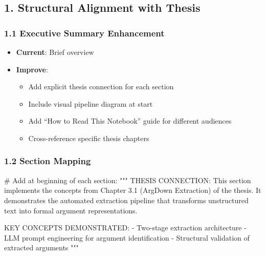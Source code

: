 \documentclass[
  11pt,
  letterpaper,
]{book}
\newenvironment{Shaded}{\begin{snugshade}}{\end{snugshade}}
\newcommand{\CommentTok}[1]{\textcolor[rgb]{0.37,0.37,0.37}{#1}}
\providecommand{\tightlist}{%
  \setlength{\itemsep}{0pt}\setlength{\parskip}{0pt}}
\begin{document}
\subsection{1. Structural Alignment with
Thesis}\label{structural-alignment-with-thesis}

\subsubsection{1.1 Executive Summary
Enhancement}\label{executive-summary-enhancement}

\begin{itemize}
\tightlist
\item
  \textbf{Current}: Brief overview
\item
  \textbf{Improve}:

  \begin{itemize}
  \tightlist
  \item
    Add explicit thesis connection for each section
  \item
    Include visual pipeline diagram at start
  \item
    Add ``How to Read This Notebook'' guide for different audiences
  \item
    Cross-reference specific thesis chapters
  \end{itemize}
\end{itemize}

\subsubsection{1.2 Section Mapping}\label{section-mapping}

\begin{Shaded}
\begin{Highlighting}[]
\CommentTok{\# Add at beginning of each section:}
\CommentTok{"""}
\CommentTok{THESIS CONNECTION: This section implements the concepts from Chapter 3.1 }
\CommentTok{(ArgDown Extraction) of the thesis. It demonstrates the automated extraction }
\CommentTok{pipeline that transforms unstructured text into formal argument representations.}

\CommentTok{KEY CONCEPTS DEMONSTRATED:}
\CommentTok{{-} Two{-}stage extraction architecture}
\CommentTok{{-} LLM prompt engineering for argument identification  }
\CommentTok{{-} Structural validation of extracted arguments}
\CommentTok{"""}
\end{Highlighting}
\end{Shaded}
\end{document}
